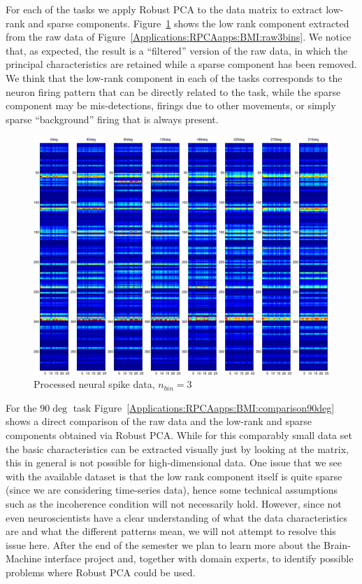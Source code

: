 \documentclass{../../common/projectreport}
\begin{document}
For each of the tasks we apply Robust PCA to the data matrix to extract low-rank and sparse components. Figure~\ref{Applications:RPCAapps:BMI:processed3bins} shows the low rank component extracted from the raw data of Figure~\ref{Applications:RPCAapps:BMI:raw3bins}. We notice that, as expected, the result is a ``filtered'' version of the raw data, in which the principal characteristics are retained while a sparse component has been removed. We think that the low-rank component in each of the tasks corresponds to the neuron firing pattern that can be directly related to the task, while the sparse component may be mis-detections, firings due to other movements, or simply sparse ``background'' firing that is always present.

%
\begin{figure}[h]
\centering
\includegraphics[width=\textwidth]{../figures/BMI_processed_3bins}
\caption{Processed neural spike data, $n_{bin}=3$}
\label{Applications:RPCAapps:BMI:processed3bins}
\end{figure}
%
For the $90\deg$ task Figure~\ref{Applications:RPCAapps:BMI:comparison90deg} shows a direct comparison of the raw data and the low-rank and sparse components obtained via Robust PCA. While for this comparably small data set the basic characteristics can be extracted visually just by looking at the matrix, this in general is not possible for high-dimensional data. One issue that we see with the available dataset is that the low rank component itself is quite sparse (since we are considering time-series data), hence some technical assumptions such as the incoherence condition will not necessarily hold. However, since not even neuroscientists have a clear understanding of what the data characteristics are and what the different patterns mean, we will not attempt to resolve this issue here. After the end of the semester we plan to learn more about the Brain-Machine interface project and, together with domain experts, to identify possible problems where Robust PCA could be used.
\end{document}
